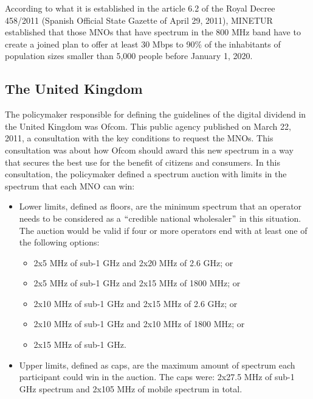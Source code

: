 
According to what it is established in the article 6.2 of the Royal Decree 458/2011 (Spanish Official State Gazette of April 29, 2011), MINETUR established that those MNOs that have spectrum in the 800 MHz band have to create a joined plan to offer at least 30 Mbps to 90$\%$  of the inhabitants of population sizes smaller than 5,000 people before January 1, 2020.\par




\subsection*{The United Kingdom}
The policymaker responsible for defining the guidelines of the digital dividend in the United Kingdom was Ofcom. This public agency published on March 22, 2011, a consultation \cite{2-13} with the key conditions to request the MNOs. This consultation was about how Ofcom should award this new spectrum in a way that secures the best use for the benefit of citizens and consumers. In this consultation, the policymaker defined a spectrum auction with limits in the spectrum that each MNO can win:\par
\begin{itemize}
	\item Lower limits, defined as floors, are the minimum spectrum that an operator needs to be considered as a $``$credible national wholesaler$"$  in this situation. The auction would be valid if four or more operators end with at least one of the following options:\par

\begin{itemize}
	\item 2x5 MHz of sub-1 GHz and 2x20 MHz of 2.6 GHz; or
	\item 2x5 MHz of sub-1 GHz and 2x15 MHz of 1800 MHz; or
	\item 2x10 MHz of sub-1 GHz and 2x15 MHz of 2.6 GHz; or
	\item 2x10 MHz of sub-1 GHz and 2x10 MHz of 1800 MHz; or
	\item 2x15 MHz of sub-1 GHz.\par
\end{itemize}
	\item Upper limits, defined as caps, are the maximum amount of spectrum each participant could win in the auction. The caps were: 2x27.5 MHz of sub-1 GHz spectrum and 2x105 MHz of mobile spectrum in total.\par
\end{itemize}

